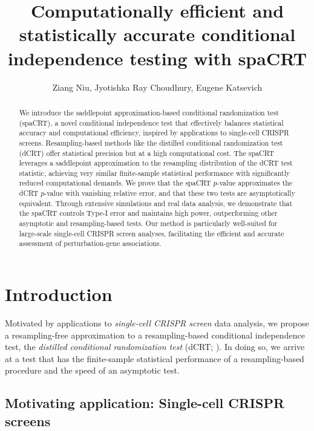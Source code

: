 \documentclass[12pt]{article}
\title{Computationally efficient and statistically accurate conditional independence testing with spaCRT}
\theoremstyle{definition}
\begin{document}
\author{Ziang Niu, Jyotishka Ray Choudhury, Eugene Katsevich}
\maketitle

\begin{abstract}
  We introduce the saddlepoint approximation-based conditional randomization test (spaCRT), a novel conditional independence test that effectively balances statistical accuracy and computational efficiency, inspired by applications to single-cell CRISPR screens. Resampling-based methods like the distilled conditional randomization test (dCRT) offer statistical precision but at a high computational cost. The spaCRT leverages a saddlepoint approximation to the resampling distribution of the dCRT test statistic, achieving very similar finite-sample statistical performance with significantly reduced computational demands. We prove that the spaCRT $p$-value approximates the dCRT $p$-value with vanishing relative error, and that these two tests are asymptotically equivalent. Through extensive simulations and real data analysis, we demonstrate that the spaCRT controls Type-I error and maintains high power, outperforming other asymptotic and resampling-based tests. Our method is particularly well-suited for large-scale single-cell CRISPR screen analyses, facilitating the efficient and accurate assessment of perturbation-gene associations.
\end{abstract}

\section{Introduction} \label{sec:introduction}

Motivated by applications to \textit{single-cell CRISPR screen} data analysis, we propose a resampling-free approximation to a resampling-based conditional independence test, the \textit{distilled conditional randomization test} (dCRT; \cite{Liu2022a}). In doing so, we arrive at a test that has the finite-sample statistical performance of a resampling-based procedure and the speed of an asymptotic test. 

\subsection{Motivating application: Single-cell CRISPR screens}
\end{document}
